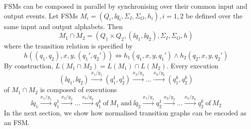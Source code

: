 FSMs can be composed in parallel by synchronising over their common input and
output events. Let FSMs $M_i=(Q_i, \ii{q_i}, \Sigma_I, \Sigma_O,  h_i), i =
1,2$ be defined over the same input and output alphabets. Then
$$
M_1 \cap M_2 = (Q_1\times Q_2, (\ii{q_1},\ii{q_2}),\Sigma_I, \Sigma_O, h)
$$
where the transition relation is specified by
$$
h((q_1,q_2),x,y,(q_1',q_2')) \Leftrightarrow h_1(q_1,x,y,q_1') \wedge h_2(q_2,x,y,q_2')
$$
By construction, $L(M_1 \cap M_2) = L(M_1) \cap L(M_2)$. Every execution
$$
(\ii{q_1},\ii{q_2}) \xrightarrow{x_1/y_1} (q_1^1,q_2^1)
\xrightarrow{x_2/y_2} \dots \xrightarrow{x_k/y_k} (q_1^{k},q_2^{k})
$$
of
$M_1\cap M_2$
is composed of executions
$$
\ii{q_1} \xrightarrow{x_1/y_1} q_1^1
\xrightarrow{x_2/y_2} \dots \xrightarrow{x_k/y_k} q_1^{k}\
\text{of}\ M_1\ \text{and}\
\ii{q_2} \xrightarrow{x_1/y_1} q_2^1
\xrightarrow{x_2/y_2} \dots \xrightarrow{x_k/y_k} q_2^{k}\
\text{of}\ M_2
$$
In the next section, we show how normalised transition graphs can be encoded
as an FSM.
